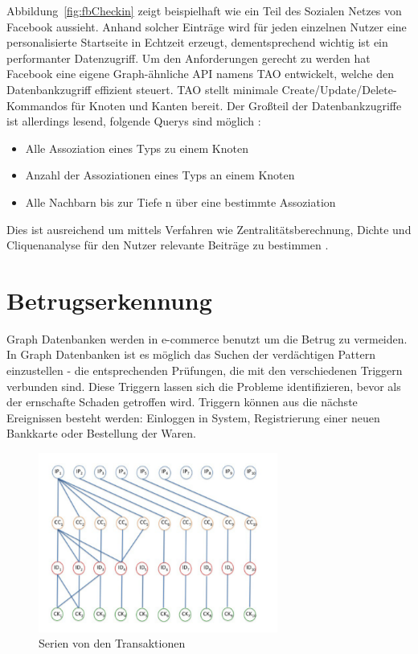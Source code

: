 Abbildung~\ref{fig:fbCheckin} zeigt beispielhaft wie ein Teil des Sozialen Netzes von Facebook aussieht. Anhand solcher Einträge wird für jeden einzelnen Nutzer eine personalisierte Startseite in Echtzeit erzeugt, dementsprechend wichtig ist ein performanter Datenzugriff. Um den Anforderungen gerecht zu werden hat Facebook eine eigene Graph-ähnliche API namens TAO entwickelt, welche den Datenbankzugriff effizient steuert. TAO stellt minimale Create/Update/Delete-Kommandos für Knoten und Kanten bereit. Der Großteil der Datenbankzugriffe ist allerdings lesend, folgende Querys sind möglich \cite{facebookTao}:
\begin{itemize}
	\item Alle Assoziation eines Typs zu einem Knoten
	\item Anzahl der Assoziationen eines Typs an einem Knoten
	\item Alle Nachbarn bis zur Tiefe n über eine bestimmte Assoziation
\end{itemize}
Dies ist ausreichend um mittels Verfahren wie Zentralitätsberechnung, Dichte und Cliquenanalyse für den Nutzer relevante Beiträge zu bestimmen \cite{sozialeNetzwerkanalyse}.


\section{Betrugserkennung}
Graph Datenbanken werden in e-commerce benutzt um die Betrug zu vermeiden. In Graph Datenbanken ist es möglich das Suchen der verdächtigen Pattern einzustellen - die entsprechenden Prüfungen, die mit den verschiedenen Triggern verbunden sind. Diese Triggern lassen sich die Probleme identifizieren, bevor als der ernschafte Schaden getroffen wird. Triggern können aus die nächste Ereignissen besteht werden: Einloggen in System, Registrierung einer neuen Bankkarte oder Bestellung der Waren.

\begin{figure}
	\caption{Serien von den Transaktionen
	\cite{Betrugserkennung}}
	\label{fig:Trs}
	\centering
	\includegraphics[width=0.7\textwidth]{images/Betrugserkennung.png}
\end{figure}

